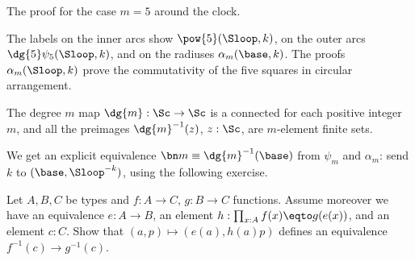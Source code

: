\begin{marginfigure}
  \caption{The proof for the case $m=5$ around the clock.}
  \label{fig:psi-alpha-5-clock}
\end{marginfigure}
The labels on the inner arcs show $\pow{5}(\Sloop,k)$, on the
outer arcs $\dg{5}\psi_5(\Sloop,k)$, and on the radiuses
$\alpha_m(\base,k)$. The proofs $\alpha_m(\Sloop,k)$ prove
the commutativity of the five squares in circular arrangement.

 
\begin{corollary}
  The degree $m$ map $\dg{m}:\Sc\to\Sc$ is a connected \covering for each positive integer $m$,
  and all the preimages $\dg{m}^{-1}(z)$, $z:\Sc$, are $m$-element finite sets.
\end{corollary}
We get an explicit equivalence $\bn m \equiv \dg{m}^{-1}(\base)$ from $\psi_m$
and $\alpha_m$: send $k$ to $(\base,\Sloop^{-k})$, using the following exercise.

\begin{xca}\label{xca:preim-eq}
  Let $A,B,C$ be types and $f:A\to C$, $g:B\to C$ functions. 
  Assume moreover we have an equivalence $e: A\to B$, 
  an element $h: \prod_{x:A} f(x)\eqto g(e(x))$, and an element $c:C$.  
  Show that $(a,p)\mapsto (e(a),h(a)p)$
  defines an equivalence $f^{-1}(c)\to g^{-1}(c)$.
\end{xca}

